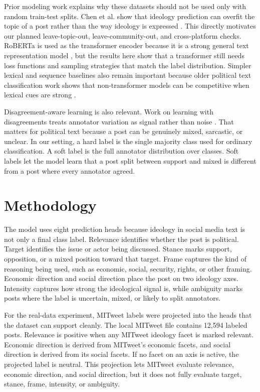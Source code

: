 \documentclass[11pt,twocolumn]{article}
\begin{document}
Prior modeling work explains why these datasets should not be used only with random train-test splits. Chen et al. show that ideology prediction can overfit the topic of a post rather than the way ideology is expressed \cite{chen-etal-2023-ideology}. This directly motivates our planned leave-topic-out, leave-community-out, and cross-platform checks. RoBERTa is used as the transformer encoder because it is a strong general text representation model \cite{liu2019roberta}, but the results here show that a transformer still needs loss functions and sampling strategies that match the label distribution. Simpler lexical and sequence baselines also remain important because older political text classification work shows that non-transformer models can be competitive when lexical cues are strong \cite{chang-masterson-2020-wordorder}.

Disagreement-aware learning is also relevant. Work on learning with disagreements treats annotator variation as signal rather than noise \cite{leonardelli-etal-2025-lewidi}. That matters for political text because a post can be genuinely mixed, sarcastic, or unclear. In our setting, a hard label is the single majority class used for ordinary classification. A soft label is the full annotator distribution over classes. Soft labels let the model learn that a post split between support and mixed is different from a post where every annotator agreed.

\section{Methodology}

The model uses eight prediction heads because ideology in social media text is not only a final class label. Relevance identifies whether the post is political. Target identifies the issue or actor being discussed. Stance marks support, opposition, or a mixed position toward that target. Frame captures the kind of reasoning being used, such as economic, social, security, rights, or other framing. Economic direction and social direction place the post on two ideology axes. Intensity captures how strong the ideological signal is, while ambiguity marks posts where the label is uncertain, mixed, or likely to split annotators.

For the real-data experiment, MITweet labels were projected into the heads that the dataset can support cleanly. The local MITweet file contains 12,594 labeled posts. Relevance is positive when any MITweet ideology facet is marked relevant. Economic direction is derived from MITweet's economic facets, and social direction is derived from its social facets. If no facet on an axis is active, the projected label is neutral. This projection lets MITweet evaluate relevance, economic direction, and social direction, but it does not fully evaluate target, stance, frame, intensity, or ambiguity.
\end{document}
